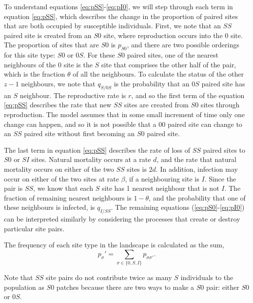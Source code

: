 \documentclass[11pt, oneside]{article}   	%
\begin{document}
To understand equations \ref{eq:pSS}-\ref{eq:pI0}, we will step through each term in equation \ref{eq:pSS}, which describes the change in the proportion of paired sites that are both occupied by susceptible individuals. First, we note that an $SS$ paired site is created from an $S0$ site, where reproduction occurs into the $0$ site. The proportion of sites that are $S0$ is $p_{S0}$, and there are two possible orderings for this site type: $S0$ or $0S$. For these $S0$ paired sites, one of the nearest neighbours of the $0$ site is the $S$ site that comprises the other half of the pair, which is the fraction $\theta$ of all the neighbours. To calculate the status of the other $z-1$ neighbours, we note that $q_{S/0S}$ is the probability that an $0S$ paired site has an $S$ neighbour. The reproductive rate is $r$, and so the first term of the equation \ref{eq:pSS} describes the rate that new $SS$ sites are created from $S0$ sites through reproduction. The model assumes that in some small increment of time only one change can happen, and so it is not possible that a $00$ paired site can change to an $SS$ paired site without first becoming an $S0$ paired site.

The last term in equation \ref{eq:pSS} describes the rate of loss of $SS$ paired sites to $S0$ or $SI$ sites. Natural mortality occurs at a rate $d$, and the rate that natural mortality occurs on either of the two $SS$ sites is $2d$. In addition, infection may occur on either of the two sites at rate $\beta$, if a neighbouring site is $I$. Since the pair is $SS$, we know that each $S$ site has 1 nearest neighbour that is not $I$. The fraction of remaining nearest neighbours is $1-\theta$, and the probability that one of these neighbours is infected, is $q_{I/SS}$. The remaining equations (\ref{eq:pS0}-\ref{eq:pI0}) can be interpreted similarly by considering the processes that create or destroy particular site pairs.

The frequency of each site type in the landscape is calculated as the sum,
%
\begin{equation}\label{eq:psigma}
p_\sigma' = \sum_{\sigma\in\{0,S,I\}} p_{\sigma \sigma'}.
\end{equation}

Note that $SS$ site pairs do not contribute twice as many $S$ individuals to the population as $S0$ patches because there are two ways to make a $S0$ pair: either $S0$ or $0S$.
\end{document}

